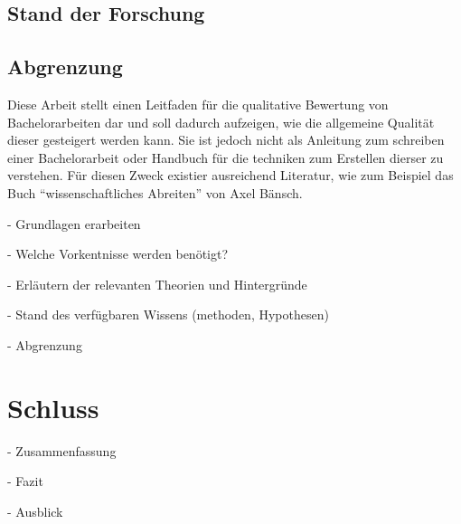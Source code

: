 \subsection{Stand der Forschung}


\subsection{Abgrenzung}
Diese Arbeit stellt einen Leitfaden für die qualitative Bewertung von Bachelorarbeiten dar und soll dadurch aufzeigen, wie die allgemeine Qualität dieser gesteigert werden kann. Sie ist jedoch nicht als Anleitung zum schreiben einer Bachelorarbeit oder Handbuch für die techniken zum Erstellen dierser zu verstehen. Für diesen Zweck existier ausreichend Literatur, wie zum Beispiel das Buch \enquote{wissenschaftliches Abreiten} von Axel Bänsch.\cite{Baensch:2013}

- Grundlagen erarbeiten

- Welche Vorkentnisse werden benötigt?

- Erläutern der relevanten Theorien und Hintergründe

- Stand des verfügbaren Wissens (methoden, Hypothesen)

- Abgrenzung


\section{Schluss}

- Zusammenfassung

- Fazit

- Ausblick
